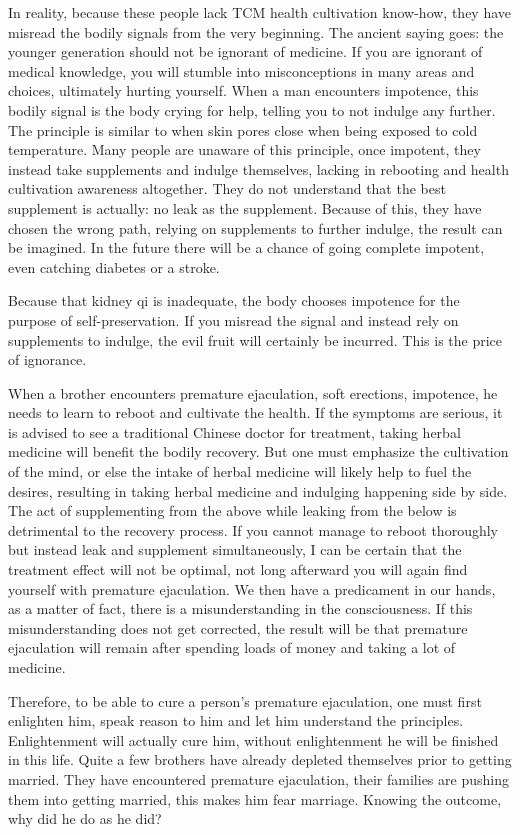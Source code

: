 \documentclass[
]{book}
\begin{document}
In reality, because these people lack TCM health cultivation know-how, they have misread the bodily signals from the very beginning. The ancient saying goes: the younger generation should not be ignorant of medicine. If you are ignorant of medical knowledge, you will stumble into misconceptions in many areas and choices, ultimately hurting yourself. When a man encounters impotence, this bodily signal is the body crying for help, telling you to not indulge any further. The principle is similar to when skin pores close when being exposed to cold temperature. Many people are unaware of this principle, once impotent, they instead take supplements and indulge themselves, lacking in rebooting and health cultivation awareness altogether. They do not understand that the best supplement is actually: no leak as the supplement. Because of this, they have chosen the wrong path, relying on supplements to further indulge, the result can be imagined. In the future there will be a chance of going complete impotent, even catching diabetes or a stroke.

Because that kidney qi is inadequate, the body chooses impotence for the purpose of self-preservation. If you misread the signal and instead rely on supplements to indulge, the evil fruit will certainly be incurred. This is the price of ignorance.

When a brother encounters premature ejaculation, soft erections, impotence, he needs to learn to reboot and cultivate the health. If the symptoms are serious, it is advised to see a traditional Chinese doctor for treatment, taking herbal medicine will benefit the bodily recovery. But one must emphasize the cultivation of the mind, or else the intake of herbal medicine will likely help to fuel the desires, resulting in taking herbal medicine and indulging happening side by side. The act of supplementing from the above while leaking from the below is detrimental to the recovery process. If you cannot manage to reboot thoroughly but instead leak and supplement simultaneously, I can be certain that the treatment effect will not be optimal, not long afterward you will again find yourself with premature ejaculation. We then have a predicament in our hands, as a matter of fact, there is a misunderstanding in the consciousness. If this misunderstanding does not get corrected, the result will be that premature ejaculation will remain after spending loads of money and taking a lot of medicine.

Therefore, to be able to cure a person's premature ejaculation, one must first enlighten him, speak reason to him and let him understand the principles. Enlightenment will actually cure him, without enlightenment he will be finished in this life. Quite a few brothers have already depleted themselves prior to getting married. They have encountered premature ejaculation, their families are pushing them into getting married, this makes him fear marriage. Knowing the outcome, why did he do as he did?
\end{document}
